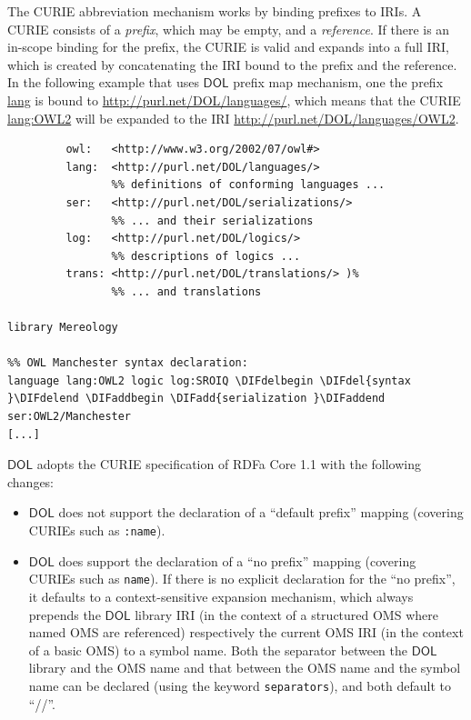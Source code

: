 \documentclass[10pt,fleqn,final]{scrreprt}
\makeatletter
\newcommand*\CommentAuthor{}
\renewcommand*\CommentAuthor{#1}}
\newcommand*\CommentDate{}
\renewcommand*\CommentDate{#1}}
\newcommand*\CommentId{}
\renewcommand*\CommentId{#1}}
\newcommand*\CommentType{}
\renewcommand*\CommentType{#1}}
\newcommand*{\SetCommentColorByType}[1]{%
\edef\localType{{#1}}%
\expandafter\ifstrequal\localType{q-aut}{\colorlet{CommentColor}{red}}{%
\expandafter\ifstrequal\localType{q-all}{\colorlet{CommentColor}{orange}}{%
\expandafter\ifstrequal\localType{todo}{\colorlet{CommentColor}{orange}}{%
\expandafter\ifstrequal\localType{fyi}{\colorlet{CommentColor}{lightgray}}{%
\colorlet{CommentColor}{yellow}}}}}}
\newcommand*{\SetCommentPrefixByType}[1]{%
\edef\localType{{#1}}%
\expandafter\@ifmtarg\localType{%
\edef\CommentPrefix{}%
}{%
\caseupper[q]{#1}%
\edef\CommentPrefix{\thestring: }%
}}
\newcommand*{\initComment}[1]{%
\setkeys{Comment}{#1}%
\SetCommentColorByType{\CommentType}%
\relax%
\SetCommentPrefixByType{\CommentType}%
\relax%
}
\newcommand*{\todonote}[2][]{%
\initComment{#1}%
\pdfcomment[author=\CommentAuthor,color=CommentColor,date=\CommentDate,id=\CommentId]{%
\CommentPrefix
#2}}
\renewcommand*{\todonote}[2][]{%
\initComment{#1}%
\ednote{\CommentPrefix #2}}
\newcommand*{\CLnote}[2][author=Christoph Lange]{%
\todonote[author=Christoph Lange,#1]{#2} 
}
\newcommand*{\syntax}[1]{\texttt{#1}}
\newcommand*{\DOL}{\ensuremath{\mathsf{DOL}}\xspace}
\newcommand{\noterefname}{note}
\newcommand{\nref}[1]{\noterefname~\ref{#1}}
\renewcommand{\nref}[1]{\ref{nref-#1}} %
\newenvironment{definitions}[0]{\medskip }{}
\providecommand{\DIFadd}[1]{{\protect\color{blue}\uwave{#1}}} %
\providecommand{\DIFdel}[1]{{\protect\color{red}\sout{#1}}}                      %
\providecommand{\DIFaddbegin}{} %
\providecommand{\DIFaddend}{} %
\providecommand{\DIFdelbegin}{} %
\providecommand{\DIFdelend}{} %
\makeatother
\begin{document}
\begin{definitions}
The CURIE abbreviation mechanism works by binding prefixes to IRIs.  A CURIE consists of a 
\emph{prefix}, which may be empty, and a \emph{reference}.  If there is an in-scope binding for the 
prefix, the CURIE is valid and expands into a full IRI, which is created by concatenating the IRI 
bound to the prefix and the reference.  In the following example that uses \DOL prefix map mechanism, one the prefix \url{lang} is bound to \url{http://purl.net/DOL/languages/}, which
means that the CURIE \url{lang:OWL2} will be expanded to the IRI
\url{http://purl.net/DOL/languages/OWL2}.

\DIFdelbegin %
\DIFdelend \DIFaddbegin \begin{lstlisting}[basicstyle=\ttfamily,language=dolText,escapechar=@,mathescape]
\DIFaddend %prefix( :      <http://www.example.org/mereology#>
         owl:   <http://www.w3.org/2002/07/owl#>
         lang:  <http://purl.net/DOL/languages/>
                %% definitions of conforming languages ...
         ser:   <http://purl.net/DOL/serializations/>
                %% ... and their serializations
         log:   <http://purl.net/DOL/logics/>
                %% descriptions of logics ...
         trans: <http://purl.net/DOL/translations/> )%
                %% ... and translations

library Mereology

%% OWL Manchester syntax declaration: 
language lang:OWL2 logic log:SROIQ \DIFdelbegin \DIFdel{syntax }\DIFdelend \DIFaddbegin \DIFadd{serialization }\DIFaddend ser:OWL2/Manchester
[...]
\end{lstlisting}


\DOL adopts the CURIE specification of RDFa Core 1.1 \DIFdelbegin %
\DIFdelend \DIFaddbegin \DIFadd{\nref{RDFa}, Section 6 }\DIFaddend with the following changes:
\begin{itemize}
\item \DOL does not support the declaration of a ``default prefix'' mapping %
(covering CURIEs such as \syntax{:name}).
\item \DOL does support the declaration  of a ``no prefix'' mapping (covering CURIEs such as 
\syntax{name}). If there is no explicit declaration for the ``no prefix'', it defaults to a 
context-sensitive expansion mechanism, which always prepends the \DOL library IRI (in the context of a 
structured OMS where named OMS are referenced) respectively the current OMS IRI (in the context of a basic
OMS) to a symbol name. Both the separator between the \DOL library and the OMS name and that between the 
OMS name and the symbol name can be declared (using the keyword \syntax{separators}), and both default to ``//''.


\end{itemize}
\end{definitions}
\end{document}
